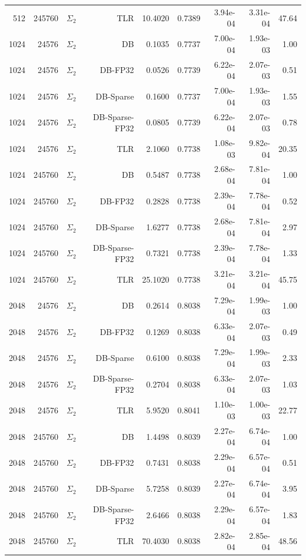 \begin{tabular}{|r|r|r|r|r|r|r|r|r|}
  512 & 245760 & $\Sigma_2$ & TLR & 10.4020 & 0.7389 & 3.94e-04 & 3.31e-04 & 47.64 \\
  1024 & 24576 & $\Sigma_2$ & DB & 0.1035 & 0.7737 & 7.00e-04 & 1.93e-03 & 1.00 \\
  1024 & 24576 & $\Sigma_2$ & DB-FP32 & 0.0526 & 0.7739 & 6.22e-04 & 2.07e-03 & 0.51 \\
  1024 & 24576 & $\Sigma_2$ & DB-Sparse & 0.1600 & 0.7737 & 7.00e-04 & 1.93e-03 & 1.55 \\
  1024 & 24576 & $\Sigma_2$ & DB-Sparse-FP32 & 0.0805 & 0.7739 & 6.22e-04 & 2.07e-03 & 0.78 \\
  1024 & 24576 & $\Sigma_2$ & TLR & 2.1060 & 0.7738 & 1.08e-03 & 9.82e-04 & 20.35 \\
  1024 & 245760 & $\Sigma_2$ & DB & 0.5487 & 0.7738 & 2.68e-04 & 7.81e-04 & 1.00 \\
  1024 & 245760 & $\Sigma_2$ & DB-FP32 & 0.2828 & 0.7738 & 2.39e-04 & 7.78e-04 & 0.52 \\
  1024 & 245760 & $\Sigma_2$ & DB-Sparse & 1.6277 & 0.7738 & 2.68e-04 & 7.81e-04 & 2.97 \\
  1024 & 245760 & $\Sigma_2$ & DB-Sparse-FP32 & 0.7321 & 0.7738 & 2.39e-04 & 7.78e-04 & 1.33 \\
  1024 & 245760 & $\Sigma_2$ & TLR & 25.1020 & 0.7738 & 3.21e-04 & 3.21e-04 & 45.75 \\
  2048 & 24576 & $\Sigma_2$ & DB & 0.2614 & 0.8038 & 7.29e-04 & 1.99e-03 & 1.00 \\
  2048 & 24576 & $\Sigma_2$ & DB-FP32 & 0.1269 & 0.8038 & 6.33e-04 & 2.07e-03 & 0.49 \\
  2048 & 24576 & $\Sigma_2$ & DB-Sparse & 0.6100 & 0.8038 & 7.29e-04 & 1.99e-03 & 2.33 \\
  2048 & 24576 & $\Sigma_2$ & DB-Sparse-FP32 & 0.2704 & 0.8038 & 6.33e-04 & 2.07e-03 & 1.03 \\
  2048 & 24576 & $\Sigma_2$ & TLR & 5.9520 & 0.8041 & 1.10e-03 & 1.00e-03 & 22.77 \\
  2048 & 245760 & $\Sigma_2$ & DB & 1.4498 & 0.8039 & 2.27e-04 & 6.74e-04 & 1.00 \\
  2048 & 245760 & $\Sigma_2$ & DB-FP32 & 0.7431 & 0.8038 & 2.29e-04 & 6.57e-04 & 0.51 \\
  2048 & 245760 & $\Sigma_2$ & DB-Sparse & 5.7258 & 0.8039 & 2.27e-04 & 6.74e-04 & 3.95 \\
  2048 & 245760 & $\Sigma_2$ & DB-Sparse-FP32 & 2.6466 & 0.8038 & 2.29e-04 & 6.57e-04 & 1.83 \\
  2048 & 245760 & $\Sigma_2$ & TLR & 70.4030 & 0.8038 & 2.82e-04 & 2.85e-04 & 48.56 \\

\end{tabular}

